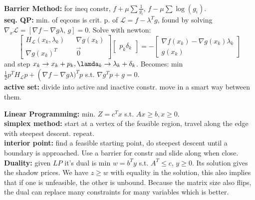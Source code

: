\\{\bf Barrier Method:} for ineq constr, $f + \mu \sum \frac{1}{g_i}$, $f - \mu \sum\log(g_i)$.
\\{\bf seq. QP:} min. of eqcons is crit. p. of $\mathcal{L} = f-\lambda^T g$, found by solving $\nabla_x \mathcal{L} = [\nabla f- \nabla g \lambda,\, g] = 0$. Solve with newton:
$$\begin{bmatrix}
H_\mathcal{L}(x_k, \lambda_k)&&\nabla g(x_k)\\
\nabla g(x_k)^T && \vec 0
\end{bmatrix}
\begin{bmatrix}
p_k
\delta_k
\end{bmatrix}
= -
\begin{bmatrix}
\nabla f(x_k) - \nabla g(x_k)\lambda_k\\
g(x_k)
\end{bmatrix}
$$
and step $x_k \to x_k+p_k, \lamda_k \to \lambda_k + \delta_k$. Becomes: min $\frac{1}{2}p^TH_\mathcal{L}p+\left(\nabla f -\nabla g\lambda)^Tp$ s.t. $\nabla g^Tp + g=0$.
\\{\bf active set:} divide into active and inactive constr. move in a smart way between them.
\par{\bf Linear Programming: }min. $Z = c^Tx$ s.t. $Ax \geq b, x \geq 0$.
\\{\bf simplex method: } start at a vertex of the feasible region, travel along the edge with steepest descent. repeat.
\\{\bf interior point: } find a feasible starting point, do steepest descent until a boundary is approached. Use a barrier for constr and slide along when close.
\\{\bf Duality: }given $LP$ it's dual is min $w = b^Ty$ s.t. $A^T\leq c,\, y\geq 0$. Its solution gives the shadow prices. We have $z \geq w$ with equality in the solution, this also implies that if one is unfeasible, the other is unbound. Because the matrix size also flips, the dual can replace many constraints for many variables which is better.

